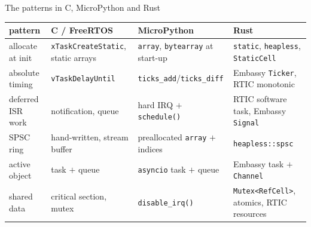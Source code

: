 \begin{frame}{The patterns in C, MicroPython and Rust}
  \begin{center}\footnotesize
  \begin{tabular}{@{}p{}p{}p{}p{}@{}}
    \toprule
    pattern & C / FreeRTOS & MicroPython & Rust \\
    \midrule
    allocate at init & \texttt{xTaskCreateStatic}, static arrays & \texttt{array}, \texttt{bytearray} at start-up & \texttt{static}, \texttt{heapless}, \texttt{StaticCell} \\
    absolute timing & \texttt{vTaskDelayUntil} & \texttt{ticks\_add}/\texttt{ticks\_diff} & Embassy \texttt{Ticker}, RTIC monotonic \\
    deferred ISR work & notification, queue & hard IRQ $+$ \texttt{schedule()} & RTIC software task, Embassy \texttt{Signal} \\
    SPSC ring & hand-written, stream buffer & preallocated \texttt{array} $+$ indices & \texttt{heapless::spsc} \\
    active object & task $+$ queue & \texttt{asyncio} task $+$ queue & Embassy task $+$ \texttt{Channel} \\
    shared data & critical section, mutex & \texttt{disable\_irq()} & \texttt{Mutex<RefCell>}, atomics, RTIC resources \\
    \bottomrule
  \end{tabular}
  \end{center}
\end{frame}


\scriptonly{\fussy}
